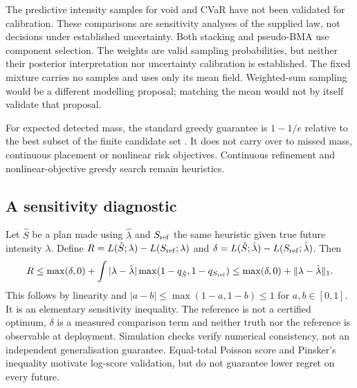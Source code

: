 \documentclass[11pt]{article}
\begin{document}
The predictive intensity samples for void and CVaR have not been validated
for calibration. These comparisons are sensitivity analyses of the supplied
law, not decisions under established uncertainty. Both stacking and
pseudo-BMA use component selection. The weights are valid sampling
probabilities, but neither their posterior interpretation nor uncertainty
calibration is established. The fixed mixture carries no samples and uses
only its mean field. Weighted-sum sampling would be a different modelling
proposal; matching the mean would not by itself validate that proposal.

For expected detected mass, the standard greedy guarantee is $1-1/e$
relative to the best subset of the finite candidate set
\cite{nemhauser1978}. It does not carry over to missed mass, continuous
placement or nonlinear risk objectives. Continuous refinement and
nonlinear-objective greedy search remain heuristics.

\subsection{A sensitivity diagnostic}
Let $\hat S$ be a plan made using $\hat\lambda$ and $S_{\rm ref}$ the
same heuristic given true future intensity $\lambda$. Define
$R=L(\hat S;\lambda)-L(S_{\rm ref};\lambda)$ and
$\delta=L(\hat S;\hat\lambda)-L(S_{\rm ref};\hat\lambda)$. Then
\begin{equation}
R\le\max(\delta,0)+\int|\lambda-\hat\lambda|
\max(1-q_{\hat S},1-q_{S_{\rm ref}})
\le\max(\delta,0)+\|\lambda-\hat\lambda\|_1.
\end{equation}
This follows by linearity and $|a-b|\le\max(1-a,1-b)\le1$ for
$a,b\in[0,1]$. It is an elementary sensitivity inequality. The reference
is not a certified optimum, $\delta$ is a measured comparison term and
neither truth nor the reference is observable at deployment. Simulation
checks verify numerical consistency, not an independent generalisation
guarantee. Equal-total Poisson score and Pinsker's inequality motivate
log-score validation, but do not guarantee lower regret on every future.
\end{document}
